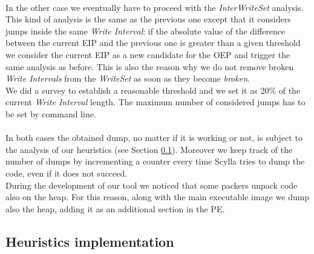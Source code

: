 \paragraph{}
In the other case we eventually have to proceed with the \textit{InterWriteSet} analysis. This kind of analysis is the same as the previous one except that it considers jumps inside the same \textit{Write Interval}: if the absolute value of the difference between the current EIP and the previous one is greater than a given threshold we consider the current EIP as a new candidate for the OEP and trigger the same analysis as before. This is also the reason why we do not remove broken \textit{Write Intervals} from the \textit{WriteSet} as soon as they become \textit{broken}.\\
We did a survey to establish a reasonable threshold and we set it as 20\% of the current  \textit{Write Interval} length. The maximum number of considered jumps has to be set by command line.
\paragraph{}
In both cases the obtained dump, no matter if it is working or not, is subject to the analysis of our heuristics (see Section \ref{Heuristics implementation}). Moreover we keep track of the number of dumps by incrementing a counter every time Scylla tries to dump the code, even if it does not succeed.\\
During the development of our tool we noticed that some packers unpack code also on the heap. For this reason, along with the main executable image we dump also the heap, adding it as an additional section in the PE.

\subsection{Heuristics implementation}
\label{Heuristics implementation}
